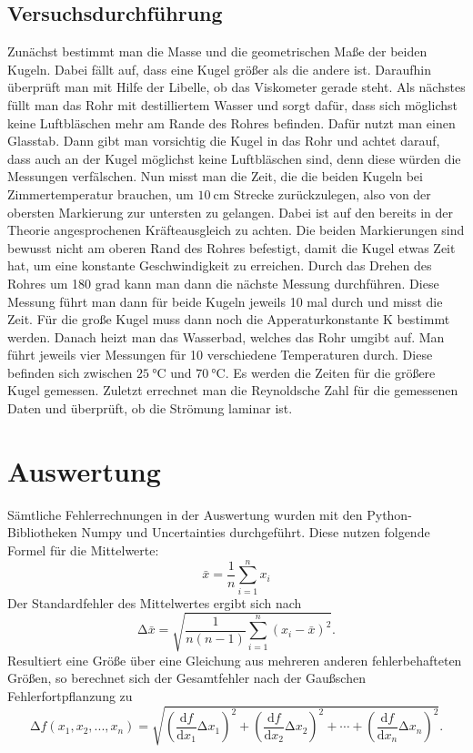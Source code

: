 \documentclass[titlepage=firstiscover, bibliography=totoc, captions=tableheading]{scrartcl}
\begin{document}
\subsection{Versuchsdurchführung}
Zunächst bestimmt man die Masse und die geometrischen Maße der beiden Kugeln.
Dabei fällt auf, dass eine Kugel größer als die andere ist.
Daraufhin überprüft man mit Hilfe der Libelle, ob das Viskometer gerade steht.
Als nächstes füllt man das Rohr mit destilliertem Wasser und sorgt dafür, dass sich
möglichst keine Luftbläschen mehr am Rande des Rohres befinden. Dafür nutzt man
einen Glasstab. Dann gibt man vorsichtig die Kugel in das Rohr und achtet
darauf, dass auch an der Kugel möglichst keine Luftbläschen sind, denn diese
würden die Messungen verfälschen. Nun misst man die Zeit, die die beiden Kugeln
bei Zimmertemperatur brauchen, um $\SI{10}{\centi\meter}$ Strecke zurückzulegen, also von der
obersten Markierung zur untersten zu gelangen. Dabei ist auf den bereits in der
Theorie angesprochenen Kräfteausgleich zu achten. Die beiden Markierungen sind
bewusst nicht am oberen Rand des Rohres befestigt, damit die Kugel etwas Zeit
hat, um eine konstante Geschwindigkeit zu erreichen. Durch
das Drehen des Rohres um 180 grad kann man dann die nächste Messung durchführen.
Diese Messung führt man dann für beide Kugeln jeweils 10 mal durch und misst die
Zeit. Für die große Kugel muss dann noch die Apperaturkonstante K bestimmt
werden. Danach heizt man das Wasserbad, welches das Rohr umgibt auf. Man führt
jeweils vier Messungen für 10 verschiedene Temperaturen durch. Diese
befinden sich zwischen $\SI{25}{\celsius}$ und $\SI{70}{\celsius}$. Es werden die Zeiten für die größere
Kugel gemessen.
Zuletzt errechnet man die Reynoldsche Zahl für die gemessenen Daten und
überprüft, ob die Strömung laminar ist.
\newpage
\section{Auswertung}
\label{sec:auswertung}
Sämtliche Fehlerrechnungen in der Auswertung wurden mit den Python-Bibliotheken
Numpy und Uncertainties durchgeführt.
Diese nutzen folgende Formel für die Mittelwerte:
\begin{equation}
    \bar{x}=\frac{1}{n}\sum_{i=1}^n x_i
    \label{eqn:mittelwert}
\end{equation}
Der Standardfehler des Mittelwertes ergibt sich nach
\begin{equation}
    \mathup{\Delta}\bar{x}=\sqrt{\frac{1}{n(n-1)}\sum_{i=1}^n\left(x_i-\bar{x}\right)^2}.
    \label{eqn:stdfehler}
\end{equation}
Resultiert eine Größe über eine Gleichung aus mehreren anderen fehlerbehafteten Größen, so
berechnet sich der Gesamtfehler nach der Gaußschen Fehlerfortpflanzung zu
\begin{equation}
    \mathup{\Delta}f(x_1,x_2,...,x_n)=\sqrt{\left(\frac{\mathup{d}f}{\mathup{d}x_1}\mathup{\Delta}x_1\right)^2+\left(\frac{\mathup{d}f}{\mathup{d}x_2}\mathup{\Delta}x_2\right)^2+ \dotsb +\left(\frac{\mathup{d}f}{\mathup{d}x_n}\mathup{\Delta}x_n\right)^2}.
    \label{eqn:gauß}
\end{equation}
\end{document}
